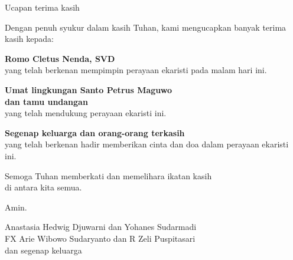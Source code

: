 \documentclass[12pt,twoside,anypage]{scrbook}
\newcommand{\keluarga}{FX Arie Wibowo Sudaryanto dan R Zeli Puspitasari\xspace}
\newcommand{\ibu}{Anastasia Hedwig Djuwarni\xspace}
\newcommand{\bapak}{Yohanes Sudarmadi\xspace}
\newcommand{\romo}{Cletus Nenda, SVD\xspace}
\begin{document}
\begin{flushright}
{\Large Ucapan terima kasih}

\noindent Dengan penuh syukur dalam kasih Tuhan, kami mengucapkan banyak
terima kasih kepada:

\textbf{Romo \romo}\\
yang telah berkenan mempimpin perayaan ekaristi pada malam hari ini.

\textbf{Umat lingkungan Santo Petrus Maguwo\\ dan tamu undangan}\\
yang telah mendukung perayaan ekaristi ini.

\textbf{Segenap keluarga dan orang-orang terkasih}\\
yang telah berkenan hadir memberikan cinta dan doa dalam perayaan
ekaristi ini.

Semoga Tuhan memberkati dan memelihara ikatan kasih\\ di antara kita semua.

Amin.

\bigskip 

\ibu dan \bapak\\
\keluarga\\
dan segenap keluarga
\end{flushright}
\end{document}
